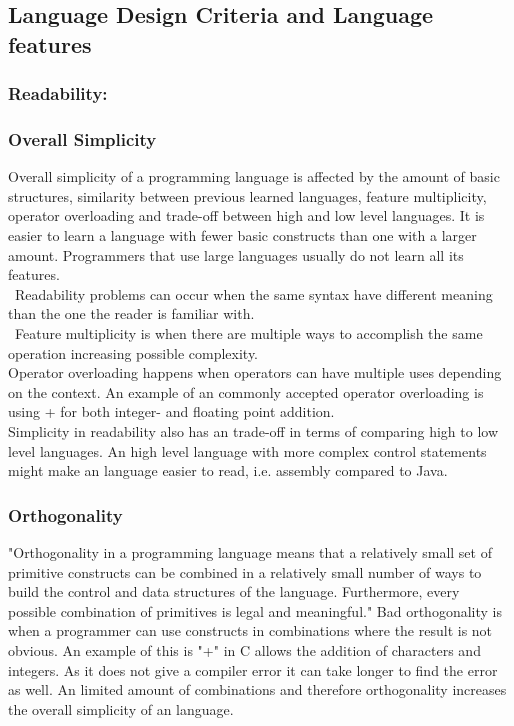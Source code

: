 \subsection{Language Design Criteria and Language features}
\label{language-design-criteria}
\label{design-criteria-theory}
\subsubsection*{Readability:}
\subsubsection*{Overall Simplicity}
Overall simplicity of a programming language is affected by the amount of basic structures, similarity between previous learned languages, feature multiplicity, operator overloading and trade-off between high and low level languages.
It is easier to learn a language with fewer basic constructs than one with a larger amount. Programmers that use large languages usually do not learn all its features. \\\
Readability problems can occur when the same syntax have different meaning than the one the reader is familiar with.  \\\
Feature multiplicity is when there are multiple ways to accomplish the same operation increasing possible complexity. \\
Operator overloading happens when operators can have multiple uses depending on the context. An example of an commonly accepted operator overloading is using + for both integer- and floating point addition. \\
Simplicity in readability also has an trade-off in terms of comparing high to low level languages. An high level language with more complex control statements might make an language easier to read, i.e. assembly compared to Java.

\subsubsection*{Orthogonality}
"Orthogonality in a programming language means that a relatively small set
of primitive constructs can be combined in a relatively small number of ways
to build the control and data structures of the language. Furthermore, every possible combination of primitives is legal and meaningful."
Bad orthogonality is when a programmer can use constructs in combinations where the result is not obvious. An example of this is "+" in C allows the addition of characters and integers. As it does not give a compiler error it can take longer to find the error as well.
An limited amount of combinations and therefore orthogonality increases the overall simplicity of an language.

